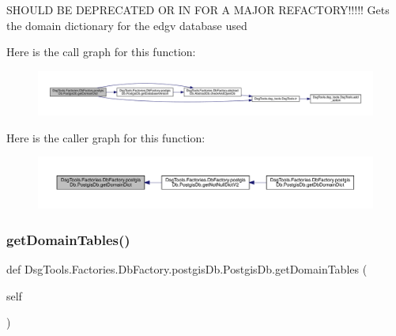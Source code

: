 \begin{DoxyVerb}SHOULD BE DEPRECATED OR IN FOR A MAJOR REFACTORY!!!!!
Gets the domain dictionary for the edgv database used
\end{DoxyVerb}
 Here is the call graph for this function\+:
\nopagebreak
\begin{figure}[H]
\begin{center}
\leavevmode
\includegraphics[width=350pt]{class_dsg_tools_1_1_factories_1_1_db_factory_1_1postgis_db_1_1_postgis_db_a7b09d35205eb58213e342938f1c498f4_cgraph}
\end{center}
\end{figure}
Here is the caller graph for this function\+:
\nopagebreak
\begin{figure}[H]
\begin{center}
\leavevmode
\includegraphics[width=350pt]{class_dsg_tools_1_1_factories_1_1_db_factory_1_1postgis_db_1_1_postgis_db_a7b09d35205eb58213e342938f1c498f4_icgraph}
\end{center}
\end{figure}
\mbox{\label{class_dsg_tools_1_1_factories_1_1_db_factory_1_1postgis_db_1_1_postgis_db_a4cc2bf6b8b10081da2a49870dbc4d33a}} 
\subsubsection{\texorpdfstring{get\+Domain\+Tables()}{getDomainTables()}}
{\footnotesize\ttfamily def Dsg\+Tools.\+Factories.\+Db\+Factory.\+postgis\+Db.\+Postgis\+Db.\+get\+Domain\+Tables (\begin{DoxyParamCaption}\item[{}]{self }\end{DoxyParamCaption})}

